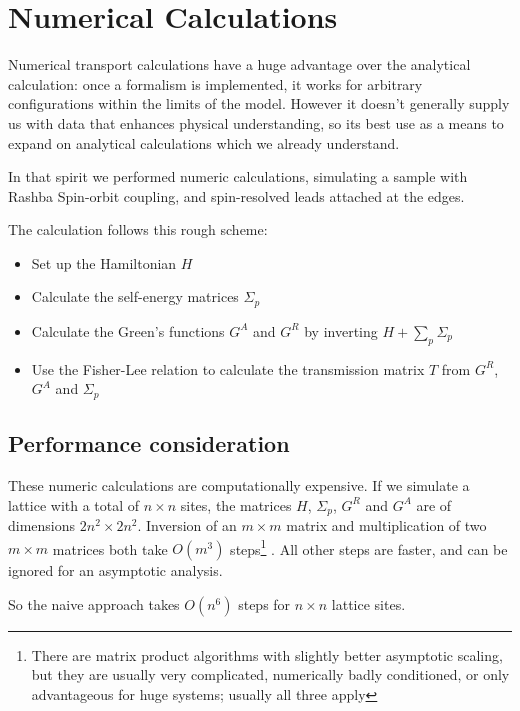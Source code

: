 \chapter{Numerical Calculations}
\newcommand{\lso}{\ensuremath{L_{\textnormal{SO}}}}
\newcommand{\tso}{\ensuremath{t_{\textnormal{SO}}}}

Numerical transport calculations have a huge advantage over the analytical
calculation: once a formalism is implemented, it works for arbitrary
configurations within the limits of the model. However it doesn't generally
supply us with data that enhances physical understanding, so its best use as a
means to expand on analytical calculations which we already understand.

In that spirit we performed numeric calculations, simulating a sample with
Rashba Spin-orbit coupling, and spin-resolved leads attached at the edges.

The calculation follows this rough scheme:

\begin{itemize}
    \item Set up the Hamiltonian $H$
    \item Calculate the self-energy matrices $\Sigma_p$
    \item Calculate the Green's functions $G^A$ and $G^R$ by inverting
          $H + \sum_p \Sigma_p$
    \item Use the Fisher-Lee relation to calculate the transmission matrix $T$
            from $G^R$, $G^A$ and $\Sigma_p$
\end{itemize}

\section{Performance consideration}

These numeric calculations are computationally expensive. If we simulate a
lattice with a total of $n \times n$ sites, the matrices $H$, $\Sigma_p$, $G^R$ and
$G^A$ are of dimensions $2n^2 \times 2n^2$. Inversion of an $m \times m $
matrix and multiplication of two $ m \times m $ matrices both take $O(m^3)$
steps\footnote{There are matrix product algorithms with slightly better
asymptotic scaling, but they are usually very complicated, numerically badly
conditioned, or only advantageous for huge systems; usually all three apply}
\cite{matrixperformance}. All other steps are faster, and can be ignored for
an asymptotic analysis.

So the naive approach takes $O(n^6)$ steps for $n \times n$ lattice sites.


